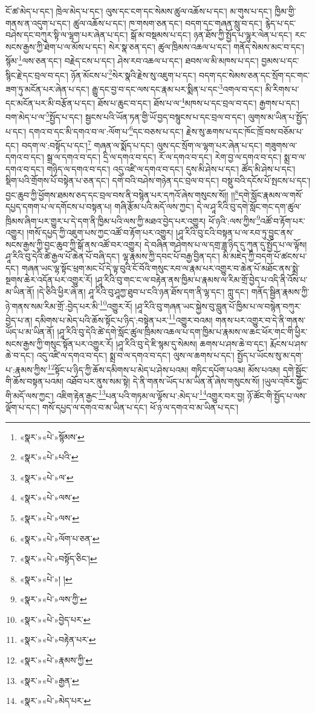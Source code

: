 ངོ་ཚ་མེད་པ་དང་། ཁྲེལ་མེད་པ་དང་། ལུས་དང་ངག་དང་སེམས་ཚུལ་འཆོས་པ་དང་། མ་གུས་པ་དང་། ཁྱིམ་གྱི་གནས་ན་འདུག་པ་དང་། ཚུལ་འཆོས་པ་དང་། ཁ་གསག་ཅན་དང་། བདག་དང་གཞན་སླུ་བ་དང་། རྙེད་པ་དང་བཤེས་དང་བཀུར་སྟི་ལ་ལྷག་པར་ཞེན་པ་དང་། སྒོ་མ་བསྡམས་པ་དང་། ཉན་ཐོས་ཀྱི་སྤྱོད་པ་ལྷུར་ལེན་པ་དང་། རང་སངས་རྒྱས་ཀྱི་ཐེག་པ་ལ་མོས་པ་དང་། སེར་སྣ་ཅན་དང་། ཚུལ་ཁྲིམས་འཆལ་པ་དང་། གནོད་སེམས་མང་བ་དང་། སྙོམ་\footnote{«སྣར་»«པེ་»སྙོམས་}ལས་ཅན་དང་། བརྗེད་ངས་པ་དང་། ཤེས་རབ་འཆལ་པ་དང་། ཐབས་ལ་མི་མཁས་པ་དང་། བྱམས་པ་དང་སྙིང་རྗེ་དང་བྲལ་བ་དང་། ཉོན་མོངས་པ་\footnote{«སྣར་»«པེ་»པའི་}སེར་སྣའི་རྗེས་སུ་འཇུག་པ་དང་། བདག་དང་སེམས་ཅན་དང་སྲོག་དང་གང་ཟག་ཏུ་མངོན་པར་ཞེན་པ་དང་། རྒྱུ་དང་བྱ་བ་དང་ལས་དང་རྣམ་པར་སྨིན་པ་དང་\footnote{«སྣར་»«པེ་»ལ་}འགལ་བ་དང་། མི་རིགས་པ་དང་མངོན་པར་མི་བརྩོན་པ་དང་། ཐོས་པ་ཆུང་བ་དང་། ཐོས་པ་ལ་\footnote{«སྣར་»«པེ་»ལས་}མཁས་པ་དང་བྲལ་བ་དང་། རྒྱགས་པ་དང་། བག་མེད་པ་ལ་\footnote{«སྣར་»«པེ་»ལས་}སྤྱོད་པ་དང་། སྦྱངས་པའི་ཡོན་ཏན་གྱི་ཡོ་བྱད་བསྙུངས་པ་དང་བྲལ་བ་དང་། ལུགས་མ་ཡིན་པ་སྤྱོད་པ་དང་། དགའ་བ་དང་མི་དགའ་བ་ལ་:ལོག་པ་\footnote{«སྣར་»«པེ་»ལོག་པ་ཅན་}དང་བཅས་པ་དང་། རྗེས་སུ་ཆགས་པ་དང་ཁོང་ཁྲོ་བས་བཅོམ་པ་དང་། བདག་ལ་:བསྟོད་པ་དང་།\footnote{«སྣར་»«པེ་»བསྟོད་ཅིང་།} གཞན་ལ་སྨོད་པ་དང་། ལུས་དང་སྲོག་ལ་ལྷག་པར་ཞེན་པ་དང་། གཟུགས་ལ་དགའ་བ་དང་། སྒྲ་ལ་དགའ་བ་དང་། དྲི་ལ་དགའ་བ་དང་། རོ་ལ་དགའ་བ་དང་། རེག་བྱ་ལ་དགའ་བ་དང་། སྨྲ་བ་ལ་དགའ་བ་དང་། གཉིད་ལ་དགའ་བ་དང་། འདུ་འཛི་ལ་དགའ་བ་དང་། དུས་མི་ཤེས་པ་དང་། ཚོད་མི་ཤེས་པ་དང་། སྡིག་པའི་གྲོགས་པོ་བསྟེན་པ་ཅན་དང་། དགེ་བའི་བཤེས་གཉེན་དང་བྲལ་བ་དང་། བསྡུ་བའི་དངོས་པོ་སྤངས་པ་དང་། བྱང་ཆུབ་ཀྱི་ཕྱོགས་ཐམས་ཅད་དང་བྲལ་བས་ནི་བསྙེན་པར་དཀའོ་ཞེས་གསུངས་སོ།། །།\footnote{«སྣར་»«པེ་»། །}དགེ་སློང་རྣམས་ལ་གསོ་དཔྱད་དགག་པ་ལ་དགོངས་པ་བསྟན་པ། གཞི་རྩོམ་པའི་མདོ་ལས་ཀྱང་། དེ་ལ་ཤཱ་རིའི་བུ་དགེ་སློང་གང་དག་ཚུལ་ཁྲིམས་ཞིག་པར་གྱུར་པ་དེ་དག་ནི་ཁྱིམ་པའི་ལས་ཀྱི་མཐའ་བྱེད་པར་འགྱུར། ཕོ་ཉའི་:ལས་ཀྱིས་\footnote{«སྣར་»«པེ་»ལས་ཀྱི་}འཚོ་བ་རྟོག་པར་འགྱུར། །གསོ་དཔྱད་ཀྱི་འཇུག་པས་ཀྱང་འཚོ་བ་རྟོག་པར་འགྱུར། །ཤཱ་རིའི་བུ་ངའི་བསྟན་པ་ལ་རབ་ཏུ་བྱུང་ནས་སངས་རྒྱས་ཀྱི་བྱང་ཆུབ་ཀྱི་སྒོ་ནས་འཚོ་བར་འགྱུར། དེ་བཞིན་གཤེགས་པ་ལ་དགྲ་ཟླ་ཉིད་དུ་ཀུན་དུ་སྤྱོད་པ་ལ་ལྟོས། ཤཱ་རིའི་བུ་དེའི་ཚེ་རྒྱལ་པོ་ཆེན་པོ་བཞི་དང་། ལྷ་རྣམས་ཀྱི་དབང་པོ་བརྒྱ་བྱིན་དང་། མི་མཇེད་ཀྱི་བདག་པོ་ཚངས་པ་དང་། གཞན་ཡང་ལྷ་སྟོང་ཕྲག་མང་པོ་དེ་ལྟ་བུའི་ངོ་བོའི་གསུང་རབ་ལ་རྣམ་པར་འགྱུར་བ་ཆེན་པོ་མཐོང་ནས་སྨྲེ་སྔགས་ཆེར་འདོན་པར་འགྱུར་རོ། །ཤཱ་རིའི་བུ་གང་ང་ལ་བརྟེན་ནས་ཁྱིམ་པ་རྣམས་ལ་རིམ་གྲོ་བྱེད་པ་འདི་ནི་འོས་པ་མ་ཡིན་ནོ། །དེ་ཅིའི་ཕྱིར་ཞེ་ན། ཤཱ་རིའི་བུ་ཤཱཀྱ་ཐུབ་པ་ངའི་ཉན་ཐོས་དག་ནི་ལྷ་དང་། ཀླུ་དང་། གནོད་སྦྱིན་རྣམས་ཀྱི་ཉེ་གནས་སམ་རིམ་གྲོ་:བྱེད་པར་མི་\footnote{«སྣར་»«པེ་»བྱེད་པར་}འགྱུར་རོ། །ཤཱ་རིའི་བུ་གཞན་ཡང་སྐྱེས་བུ་བླུན་པོ་ཁྱིམ་པ་ལ་བསྙེན་བཀུར་བྱེད་པ་ན། དམིགས་པ་མེད་པའི་ཆོས་སྟོང་པ་ཉིད་:བསྟེན་པར་\footnote{«སྣར་»«པེ་»བརྟེན་པར་}འགྱུར་བའམ། གནས་པར་འགྱུར་བ་དེ་ནི་གནས་ཡོད་པ་མ་ཡིན་ནོ། །ཤཱ་རིའི་བུ་དེའི་ཚེ་དགེ་སློང་ཚུལ་ཁྲིམས་འཆལ་པ་དག་ཁྱིམ་པ་རྣམས་ལ་ཆང་ཕོར་གང་གི་ཕྱིར་སངས་རྒྱས་ཀྱི་གསུང་སྟོན་པར་འགྱུར་རོ། །ཤཱ་རིའི་བུ་དེ་ཇི་སྙམ་དུ་སེམས། ཆགས་པ་ཤས་ཆེ་བ་དང་། རྨོངས་པ་ཤས་ཆེ་བ་དང་། འདུ་འཛི་ལ་དགའ་བ་དང་། སྨྲ་བ་ལ་དགའ་བ་དང་། ལུས་ལ་ཆགས་པ་དང་། སྤྱོད་པ་ཡོངས་སུ་མ་དག་པ་:རྣམས་ཀྱིས་\footnote{«སྣར་»«པེ་»རྣམས་ཀྱི་}སྟོང་པ་ཉིད་ཀྱི་ཆོས་དམིགས་པ་མེད་པ་ཤེས་པའམ། གཏིང་དཔོག་པའམ། མོས་པའམ། དགེ་སྦྱོང་གི་ཆོས་བསྟན་པའམ། འཐོབ་པར་ནུས་སམ་སྟེ། དེ་ནི་གནས་ཡོད་པ་མ་ཡིན་ནོ་ཞེས་གསུངས་སོ། །ཡུལ་འཁོར་སྐྱོང་གི་མདོ་ལས་ཀྱང་། འཇིག་རྟེན་རྒྱང་\footnote{«སྣར་»«པེ་»རྒྱན་}པན་པའི་གཏམ་ལ་ལྟོས་པ་:མེད་པ་\footnote{«སྣར་»«པེ་»མེད་པར་}འགྱུར་བར་བྱ། ཉོ་ཚོང་གི་སྤྱོད་པ་ལས་ལྡོག་པ་དང་། གསོ་དཔྱད་ལ་དགའ་བ་མ་ཡིན་པ་དང་། ཕོ་ཉ་ལ་དགའ་བ་མ་ཡིན་པ་དང་། 